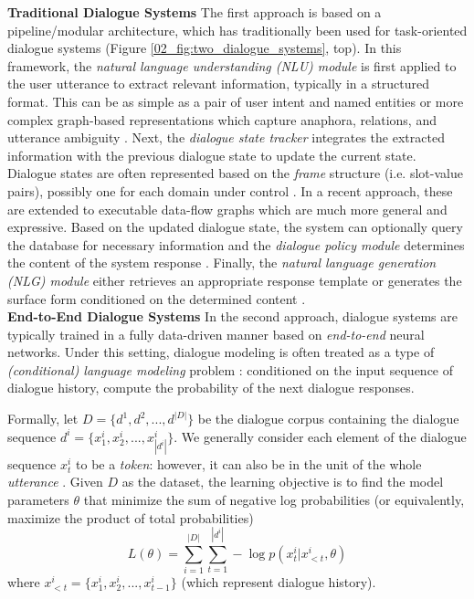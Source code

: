 \noindent
\textbf{Traditional Dialogue Systems}\quad
The first approach is based on a pipeline/modular architecture, which has traditionally been used for task-oriented dialogue systems (Figure \ref{02_fig:two_dialogue_systems}, top). In this framework, the \textit{natural language understanding (NLU) module} is first applied to the user utterance to extract relevant information, typically in a structured format. This can be as simple as a pair of user intent and named entities \citep{Gupta2006TheAS} or more complex graph-based representations which capture anaphora, relations, and utterance ambiguity \citep{kollar-etal-2018-alexa}. Next, the \textit{dialogue state tracker} integrates the extracted information with the previous dialogue state to update the current state. Dialogue states are often represented based on the \textit{frame} structure (i.e. slot-value pairs), possibly one for each domain under control \citep{elasri2017frames}. In a recent approach, these are extended to executable data-flow graphs \citep{andreas-etal-2020-task} which are much more general and expressive. Based on the updated dialogue state, the system can optionally query the database for necessary information \citep{dhingra-etal-2017-towards} and the \textit{dialogue policy module} determines the content of the system response \citep{takanobu-etal-2019-guided}. Finally, the \textit{natural language generation (NLG) module} either retrieves an appropriate response template \citep{yan2016learning} or generates the surface form conditioned on the determined content \citep{wen-etal-2015-semantically}.\\

\noindent
\textbf{End-to-End Dialogue Systems}\quad
In the second approach, dialogue systems are typically trained in a fully data-driven manner based on \textit{end-to-end} neural networks. Under this setting, dialogue modeling is often treated as a type of \textit{(conditional) language modeling} problem \citep{vinyals2015neural}: conditioned on the input sequence of dialogue history, compute the probability of the next dialogue responses.

Formally, let $D = \{d^1, d^2, ..., d^{|D|}\}$ be the dialogue corpus containing the dialogue sequence $d^i = \{x^i_1, x^i_2, ..., x^i_{|d^i|}\}$. We generally consider each element of the dialogue sequence $x^i_t$ to be a \textit{token}: however, it can also be in the unit of the whole \textit{utterance} \citep{serban2016hierarchical}. Given $D$ as the dataset, the learning objective is to find the model parameters $\theta$ that minimize the sum of negative log probabilities (or equivalently, maximize the product of total probabilities)
%
\begin{equation}\label{eqt:sequence_to_sequence}
L(\theta) = \sum_{i = 1}^{|D|} \sum_{t = 1}^{|d^i|} - \log p(x^i_t | x^i_{<t}, \theta)
\end{equation}
%
where $x^i_{<t} = \{x^i_1, x^i_2, ..., x^i_{t-1}\}$ (which represent dialogue history).

